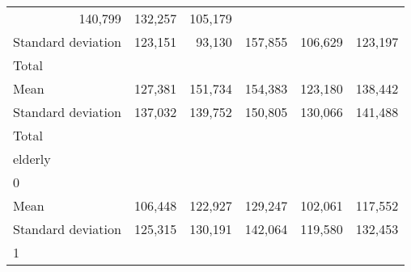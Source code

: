 \begin{tabular}{llllll}
  \multicolumn{1}{r}{140,799} &
  \multicolumn{1}{r}{132,257} &
  \multicolumn{1}{r}{105,179} \\
\multicolumn{1}{l}{\hspace{4em}Standard deviation} &
  \multicolumn{1}{|r}{123,151} &
  \multicolumn{1}{r}{93,130} &
  \multicolumn{1}{r}{157,855} &
  \multicolumn{1}{r}{106,629} &
  \multicolumn{1}{r}{123,197} \\
\multicolumn{1}{l}{\hspace{3em}Total} &
  \multicolumn{1}{|r}{} &
  \multicolumn{1}{r}{} &
  \multicolumn{1}{r}{} &
  \multicolumn{1}{r}{} &
  \multicolumn{1}{r}{} \\
\multicolumn{1}{l}{\hspace{4em}Mean} &
  \multicolumn{1}{|r}{127,381} &
  \multicolumn{1}{r}{151,734} &
  \multicolumn{1}{r}{154,383} &
  \multicolumn{1}{r}{123,180} &
  \multicolumn{1}{r}{138,442} \\
\multicolumn{1}{l}{\hspace{4em}Standard deviation} &
  \multicolumn{1}{|r}{137,032} &
  \multicolumn{1}{r}{139,752} &
  \multicolumn{1}{r}{150,805} &
  \multicolumn{1}{r}{130,066} &
  \multicolumn{1}{r}{141,488} \\
\multicolumn{1}{l}{\hspace{1em}Total} &
  \multicolumn{1}{|r}{} &
  \multicolumn{1}{r}{} &
  \multicolumn{1}{r}{} &
  \multicolumn{1}{r}{} &
  \multicolumn{1}{r}{} \\
\multicolumn{1}{l}{\hspace{2em}elderly} &
  \multicolumn{1}{|r}{} &
  \multicolumn{1}{r}{} &
  \multicolumn{1}{r}{} &
  \multicolumn{1}{r}{} &
  \multicolumn{1}{r}{} \\
\multicolumn{1}{l}{\hspace{3em}0} &
  \multicolumn{1}{|r}{} &
  \multicolumn{1}{r}{} &
  \multicolumn{1}{r}{} &
  \multicolumn{1}{r}{} &
  \multicolumn{1}{r}{} \\
\multicolumn{1}{l}{\hspace{4em}Mean} &
  \multicolumn{1}{|r}{106,448} &
  \multicolumn{1}{r}{122,927} &
  \multicolumn{1}{r}{129,247} &
  \multicolumn{1}{r}{102,061} &
  \multicolumn{1}{r}{117,552} \\
\multicolumn{1}{l}{\hspace{4em}Standard deviation} &
  \multicolumn{1}{|r}{125,315} &
  \multicolumn{1}{r}{130,191} &
  \multicolumn{1}{r}{142,064} &
  \multicolumn{1}{r}{119,580} &
  \multicolumn{1}{r}{132,453} \\
\multicolumn{1}{l}{\hspace{3em}1} &

\end{tabular}
